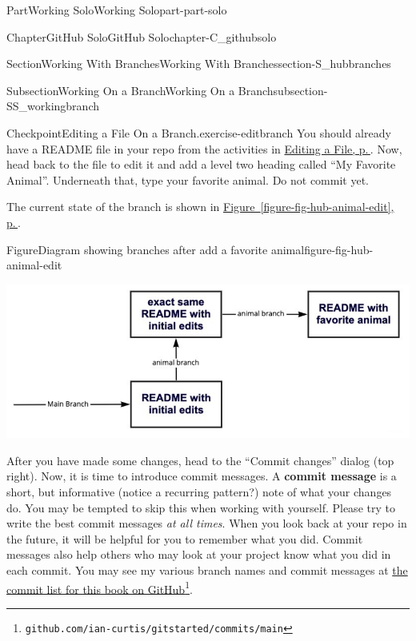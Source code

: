 \documentclass[twoside,10pt,]{book}
\newcommand{\xreffont}{\relax}
\newcommand{\terminology}[1]{\textbf{#1}}
\begin{document}
\begin{partptx}{Part}{Working Solo}{}{Working Solo}{}{}{part-part-solo}
\begin{chapterptx}{Chapter}{GitHub Solo}{}{GitHub Solo}{}{}{chapter-C_githubsolo}
\begin{sectionptx}{Section}{Working With Branches}{}{Working With Branches}{}{}{section-S_hubbranches}
\begin{subsectionptx}{Subsection}{Working On a Branch}{}{Working On a Branch}{}{}{subsection-SS_workingbranch}
\begin{inlineexercise}{Checkpoint}{Editing a File On a Branch.}{exercise-editbranch}%
You should already have a README file in your repo from the activities in \hyperref[subsection-hub-editfile]{Editing a File, p.\,\pageref{subsection-hub-editfile}}. Now, head back to the file to edit it and add a level two heading called ``My Favorite Animal''. Underneath that, type your favorite animal. Do not commit yet.%
\par
The current state of the branch is shown in \hyperref[figure-fig-hub-animal-edit]{Figure~{\xreffont\ref{figure-fig-hub-animal-edit}}, p.\,\pageref{figure-fig-hub-animal-edit}}.%
\end{inlineexercise}%
\begin{figureptx}{Figure}{Diagram showing branches after add a favorite animal}{figure-fig-hub-animal-edit}{}%
\begin{image}{0}{1}{0}{}%
\includegraphics[width=\linewidth]{external/hub_animal_edit.pdf}
\end{image}%
\tcblower
\end{figureptx}%
 After you have made some changes, head to the ``Commit changes'' dialog (top right). Now, it is time to introduce commit messages. A \terminology{commit message} is a short, but informative (notice a recurring pattern?) note of what your changes do. You may be tempted to skip this when working with yourself. Please try to write the best commit messages \emph{at all times}. When you look back at your repo in the future, it will be helpful for you to remember what you did. Commit messages also help others who may look at your project know what you did in each commit. You may see my various branch names and commit messages at \href{https://github.com/ian-curtis/gitstarted/commits/main}{the commit list for this book on GitHub}\footnote{\nolinkurl{github.com/ian-curtis/gitstarted/commits/main}\label{fn-SS_workingbranch-g-h}}.%
\par

\end{subsectionptx}
\end{sectionptx}
\end{chapterptx}
\end{partptx}
\end{document}
